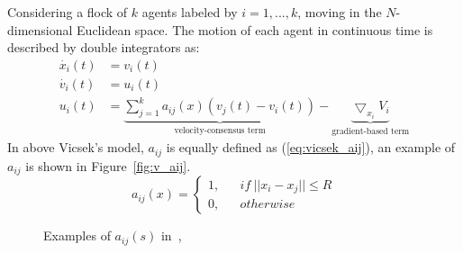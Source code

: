 Considering a flock of $k$ agents labeled by $i=1,...,k$, moving in the $N$-dimensional Euclidean space. The motion of each agent in continuous time is described by double integrators as:
\begin{equation}\label{eq:motion}
\begin{aligned}
\dot{x_i}(t)&=v_i(t)\\
\dot{v_i}(t)&=u_i(t)\\
u_i(t)&=\underbrace{\sum^k_{j=1}a_{ij}(x)(v_j(t)-v_i(t))}_{\text{velocity-consensus term}}-\underbrace{\bigtriangledown_{x_i}V_i}_{\text{gradient-based term}}
\end{aligned}
\end{equation}
In above Vicsek's model, $a_{ij}$ is equally defined as (\ref{eq:vicsek_aij}), an example of $a_{ij}$ is shown in Figure~\ref{fig:v_aij}.
\begin{equation}\label{eq:vicsek_aij}
a_{ij}(x)=\left\{\begin{array}{rcl}
1, & & {if\ ||x_i-x_j||\leq R}\\
0, & & {otherwise}
\end{array} \right.
\end{equation}

\begin{figure}[htb]
  \centering
  \caption{Examples of $a_{ij}(s)$ in~\cite{Vicsek1995},~\cite{CuckerSmale2007}}\label{fig:example_v}
\end{figure}

